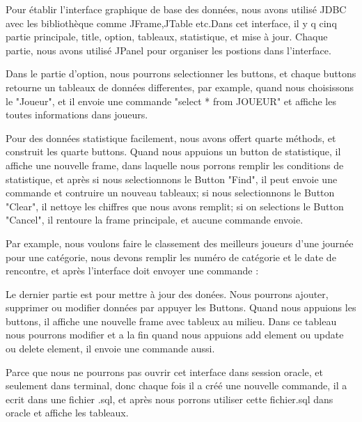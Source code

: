 Pour établir l'interface graphique de base des données, nous avons utilisé JDBC avec les bibliothèque comme JFrame,JTable etc.Dans cet interface, il y q cinq partie principale, title, option, tableaux, statistique, et mise à jour. Chaque partie, nous avons utilisé JPanel pour organiser les postions dans l'interface.

Dans le partie d'option, nous pourrons selectionner les buttons, et chaque buttons retourne un tableaux de données differentes, par example, quand nous choisissons le "Joueur", et il envoie une commande "select * from JOUEUR" et affiche les toutes informations dans joueurs.


Pour des données statistique facilement, nous avons offert quarte méthods, et construit les quarte buttons. Quand nous appuions un button de statistique, il affiche une nouvelle frame, dans laquelle nous porrons remplir les conditions de statistique, et après si nous selectionnons le Button "Find", il peut envoie une commande et contruire un nouveau tableaux; si nous selectionnons le Button "Clear", il nettoye les chiffres que nous avons remplit; si on selections le Button "Cancel", il rentoure la frame principale, et aucune commande envoie.


Par example, nous voulons faire le classement des meilleurs joueurs d'une journée pour une catégorie, nous devons remplir les numéro de catégorie et le date de rencontre, et après l'interface doit envoyer une commande :


Le dernier partie est pour mettre à jour des donées. Nous pourrons ajouter, supprimer ou modifier données par appuyer les Buttons. Quand nous appuions les buttons, il affiche une nouvelle frame avec tableux au milieu. Dans ce tableau nous pourrons modifier et a la fin quand nous appuions add element ou update ou delete element, il envoie une commande aussi.


Parce que nous ne pourrons pas ouvrir cet interface dans session oracle, et seulement dans terminal, donc chaque fois il a créé une nouvelle commande, il a ecrit dans une fichier .sql, et après nous porrons utiliser cette fichier.sql dans oracle et affiche les tableaux. 
